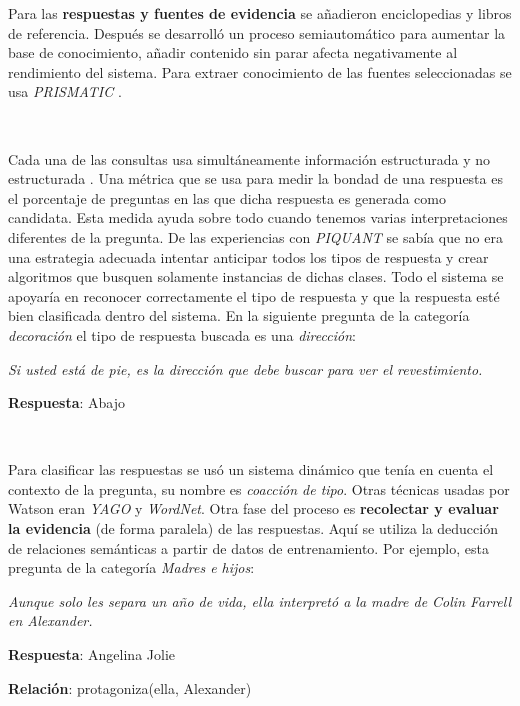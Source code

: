 \documentclass[paper=a4, fontsize=10pt]{scrartcl} %
\numberwithin{equation}{section} %
\numberwithin{figure}{section} %
\numberwithin{table}{section} %
\begin{document}
Para las \textbf{respuestas y fuentes de evidencia} se añadieron enciclopedias y libros de referencia. Después se desarrolló un proceso semiautomático para aumentar la base de conocimiento, añadir contenido sin parar afecta negativamente al rendimiento del sistema.
Para extraer conocimiento de las fuentes seleccionadas se usa \textit{PRISMATIC} \cite{prismatic}. %

\

Cada una de las consultas usa simultáneamente información estructurada y no estructurada .
Una métrica %
que se usa para medir la bondad de una respuesta es el porcentaje de preguntas en las que dicha respuesta es generada como candidata. 
Esta medida ayuda sobre todo cuando tenemos varias interpretaciones diferentes de la pregunta.
De las experiencias con \textit{PIQUANT} se sabía que no era una estrategia adecuada intentar anticipar todos los tipos de respuesta y crear algoritmos que busquen solamente instancias de dichas clases.
Todo el sistema se apoyaría en reconocer correctamente el tipo de respuesta y que la respuesta esté bien clasificada dentro del sistema.
En la siguiente pregunta de la categoría \textit{decoración} el tipo de respuesta buscada es una \textit{dirección}:

\begin{center}
\textit{Si usted está de pie, es la dirección que debe buscar para ver el revestimiento.}

\textbf{Respuesta}: Abajo
\end{center}

\

Para clasificar las respuestas se usó un sistema dinámico que tenía en cuenta el contexto de la pregunta, su nombre es \textit{coacción de tipo}. %
Otras técnicas usadas por Watson eran \textit{YAGO} y \textit{WordNet}. %
Otra fase del proceso es \textbf{recolectar y evaluar la evidencia} (de forma paralela) de las respuestas. 
Aquí se utiliza la deducción de relaciones semánticas a partir de datos de entrenamiento. Por ejemplo, esta pregunta de la categoría \textit{Madres e hijos}:

\begin{center}
\textit{Aunque solo les separa un año de vida, ella interpretó a la madre de Colin Farrell en Alexander.}

\textbf{Respuesta}: Angelina Jolie

\textbf{Relación}: protagoniza(ella, Alexander)
\end{center}
\end{document}

